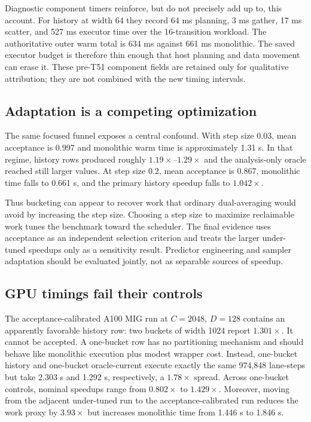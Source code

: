 \documentclass[conference]{IEEEtran}
\begin{document}
Diagnostic component timers reinforce, but do not precisely add up to, this
account.  For history at width 64 they record 64 ms planning, 3 ms gather,
17 ms scatter, and 527 ms executor time over the 16-transition workload.  The
authoritative outer warm total is 634 ms against 661 ms monolithic.  The saved
executor budget is therefore thin enough that host planning and data movement
can erase it.  These pre-T51 component fields are retained only for qualitative
attribution; they are not combined with the new timing intervals.

\subsection{Adaptation is a competing optimization}

The same focused funnel exposes a central confound.  With step size 0.03, mean
acceptance is 0.997 and monolithic warm time is approximately 1.31 s.  In that
regime, history rows produced roughly $1.19\times$--$1.29\times$ and the
analysis-only oracle reached still larger values.  At step size 0.2, mean
acceptance is 0.867, monolithic time falls to 0.661 s, and the primary history
speedup falls to $1.042\times$.

Thus bucketing can appear to recover work that ordinary dual-averaging would
avoid by increasing the step size.  Choosing a step size to maximize
reclaimable work tunes the benchmark toward the scheduler.  The final evidence
uses acceptance as an independent selection criterion and treats the larger
under-tuned speedups only as a sensitivity result.  Predictor engineering and
sampler adaptation should be evaluated jointly, not as separable sources of
speedup.

\subsection{GPU timings fail their controls}
\label{sec:gpu}

The acceptance-calibrated A100 MIG run at $C=2048$, $D=128$ contains an
apparently favorable history row: two buckets of width 1024 report
$1.301\times$.  It cannot be accepted.  A one-bucket row has no partitioning
mechanism and should behave like monolithic execution plus modest wrapper cost.
Instead, one-bucket history and one-bucket oracle-current execute exactly the
same 974,848 lane-steps but take 2.303 s and 1.292 s, respectively, a
$1.78\times$ spread.  Across one-bucket controls, nominal speedups range from
$0.802\times$ to $1.429\times$.  Moreover, moving from the adjacent under-tuned
run to the acceptance-calibrated run reduces the work proxy by $3.93\times$ but
increases monolithic time from 1.446 s to 1.846 s.
\end{document}
